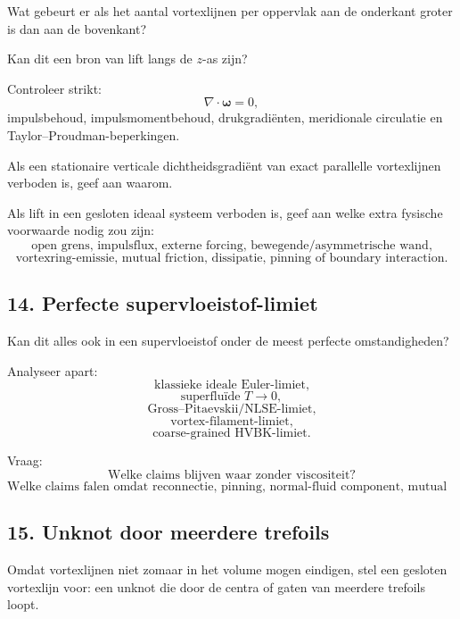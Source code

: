 \documentclass[11pt]{article}
\begin{document}
        Wat gebeurt er als het aantal vortexlijnen per oppervlak aan de onderkant groter is dan aan de bovenkant?
        
        Kan dit een bron van lift langs de \(z\)-as zijn?
        
        Controleer strikt:
        \[
            \nabla\cdot\boldsymbol{\omega}=0,
        \]
        impulsbehoud, impulsmomentbehoud, drukgradiënten, meridionale circulatie en Taylor--Proudman-beperkingen.
        
        Als een stationaire verticale dichtheidsgradiënt van exact parallelle vortexlijnen verboden is, geef aan waarom.
        
        Als lift in een gesloten ideaal systeem verboden is, geef aan welke extra fysische voorwaarde nodig zou zijn:
        \[
            \text{open grens, impulsflux, externe forcing, bewegende/asymmetrische wand,}
        \]
        \[
            \text{vortexring-emissie, mutual friction, dissipatie, pinning of boundary interaction.}
        \]
    
    \subsection{14. Perfecte supervloeistof-limiet}
        
        Kan dit alles ook in een supervloeistof onder de meest perfecte omstandigheden?
        
        Analyseer apart:
        \[
            \text{klassieke ideale Euler-limiet,}
        \]
        \[
            \text{superfluïde }T\rightarrow0,
        \]
        \[
            \text{Gross--Pitaevskii/NLSE-limiet,}
        \]
        \[
            \text{vortex-filament-limiet,}
        \]
        \[
            \text{coarse-grained HVBK-limiet.}
        \]
        
        Vraag:
        \[
            \text{Welke claims blijven waar zonder viscositeit?}
        \]
        \[
            \text{Welke claims falen omdat reconnectie, pinning, normal-fluid component, mutual friction, boundary forcing of quantisatie nodig is?}
        \]
    
    \subsection{15. Unknot door meerdere trefoils}
        
        Omdat vortexlijnen niet zomaar in het volume mogen eindigen, stel een gesloten vortexlijn voor: een unknot die door de centra of gaten van meerdere trefoils loopt.
        
\end{document}
